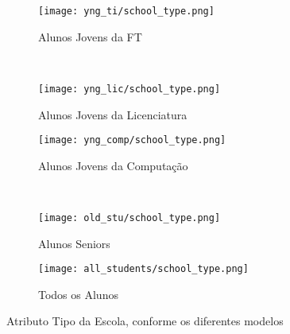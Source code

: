 \clearpage
\begin{figure}[!ht]
    \centering
    \begin{subfigure}[b]{0.48\textwidth}
        \centering
        \texttt{[image: yng\_ti/school\_type.png]}
        \caption{Alunos Jovens da FT}
    \end{subfigure}
    ~
    \begin{subfigure}[b]{0.48\textwidth}
        \centering
        \texttt{[image: yng\_lic/school\_type.png]}
        \caption{Alunos Jovens da Licenciatura}
    \end{subfigure}

    \begin{subfigure}[b]{0.48\textwidth}
        \centering
        \texttt{[image: yng\_comp/school\_type.png]}
        \caption{Alunos Jovens da Computação}
    \end{subfigure}
    ~
    \begin{subfigure}[b]{0.48\textwidth}
        \centering
        \texttt{[image: old\_stu/school\_type.png]}
        \caption{Alunos Seniors}
    \end{subfigure}

    \begin{subfigure}[b]{0.48\textwidth}
        \centering
        \texttt{[image: all\_students/school\_type.png]}
        \caption{Todos os Alunos}
    \end{subfigure}
    \caption{Atributo Tipo da Escola, conforme os diferentes modelos}
\end{figure}

